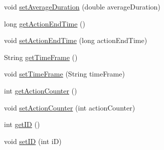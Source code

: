 \begin{DoxyCompactItemize}
\item 
void \hyperlink{classcs_1_1nsense_1_1accelerometer_1_1_actions_entry_a21538eef3d337e98e2e825c82e0852b6}{set\-Average\-Duration} (double average\-Duration)
\item 
long \hyperlink{classcs_1_1nsense_1_1accelerometer_1_1_actions_entry_affaf5ef87542b71e4a1d8fbfa980545a}{get\-Action\-End\-Time} ()
\item 
void \hyperlink{classcs_1_1nsense_1_1accelerometer_1_1_actions_entry_a6b28503fa03436cd0fdf0a5dd767de35}{set\-Action\-End\-Time} (long action\-End\-Time)
\item 
String \hyperlink{classcs_1_1nsense_1_1accelerometer_1_1_actions_entry_ac8df3fa04c907fcd1c55f0cd8274d848}{get\-Time\-Frame} ()
\item 
void \hyperlink{classcs_1_1nsense_1_1accelerometer_1_1_actions_entry_a5c8a626d832dde4c00dc8f129b246545}{set\-Time\-Frame} (String time\-Frame)
\item 
int \hyperlink{classcs_1_1nsense_1_1accelerometer_1_1_actions_entry_a5283a652c3eeb894fa5ede726942448f}{get\-Action\-Counter} ()
\item 
void \hyperlink{classcs_1_1nsense_1_1accelerometer_1_1_actions_entry_acaa6c14c19c6c8d0358dbc5105284720}{set\-Action\-Counter} (int action\-Counter)
\item 
int \hyperlink{classcs_1_1nsense_1_1accelerometer_1_1_actions_entry_abeed931a1203eabfe1cb233b2e4942c9}{get\-I\-D} ()
\item 
void \hyperlink{classcs_1_1nsense_1_1accelerometer_1_1_actions_entry_a2f45b76f03da99719aa325247a7f6605}{set\-I\-D} (int i\-D)
\end{DoxyCompactItemize}
